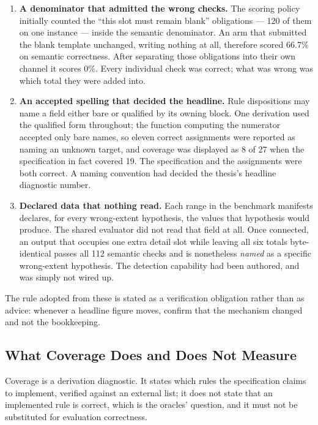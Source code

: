 \begin{enumerate}
  \item \textbf{A denominator that admitted the wrong checks.} The scoring policy initially counted the
    ``this slot must remain blank'' obligations --- 120 of them on one instance --- inside the semantic
    denominator. An arm that submitted the blank template unchanged, writing nothing at all, therefore
    scored 66.7\% on semantic correctness. After separating those obligations into their own channel it
    scores 0\%. Every individual check was correct; what was wrong was which total they were added into.
  \item \textbf{An accepted spelling that decided the headline.} Rule dispositions may name a field either
    bare or qualified by its owning block. One derivation used the qualified form throughout; the function
    computing the numerator accepted only bare names, so eleven correct assignments were reported as naming
    an unknown target, and coverage was displayed as 8 of 27 when the specification in fact covered 19. The
    specification and the assignments were both correct. A naming convention had decided the thesis's
    headline diagnostic number.
  \item \textbf{Declared data that nothing read.} Each range in the benchmark manifests declares, for every
    wrong-extent hypothesis, the values that hypothesis would produce. The shared evaluator did not read
    that field at all. Once connected, an output that occupies one extra detail slot while leaving all six
    totals byte-identical passes all 112 semantic checks and is nonetheless \emph{named} as a specific
    wrong-extent hypothesis. The detection capability had been authored, and was simply not wired up.
\end{enumerate}

The rule adopted from these is stated as a verification obligation rather than as advice: whenever a
headline figure moves, confirm that the mechanism changed and not the bookkeeping.

\subsection{What Coverage Does and Does Not Measure}

Coverage is a derivation diagnostic. It states which rules the specification claims to implement, verified
against an external list; it does not state that an implemented rule is correct, which is the oracles'
question, and it must not be substituted for evaluation correctness.


